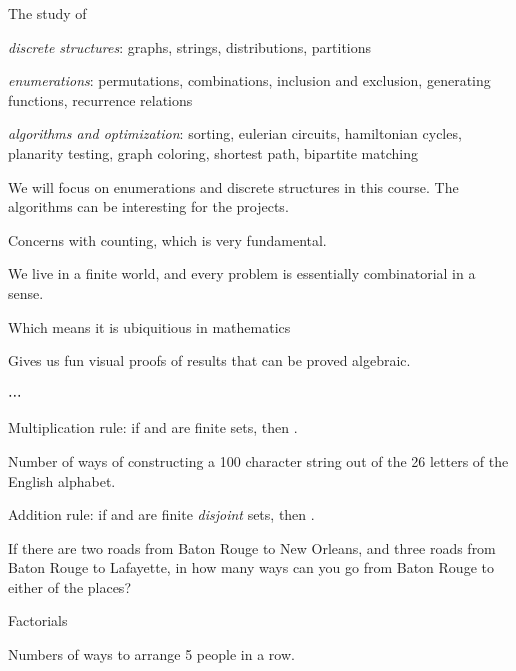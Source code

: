 \startchapter [title={Combinatorics basics}]
	
	\startsection [title={What is combinatorics?}]
		The study of
		\startitemize [r, joinedup]
			\item  \emph{discrete structures}: graphs, strings, distributions, partitions
			\item  \emph{enumerations}: permutations, combinations, inclusion and exclusion, generating functions, recurrence relations
			\item  \emph{algorithms and optimization}: sorting, eulerian circuits, hamiltonian cycles, planarity testing, graph coloring, shortest path, bipartite matching
		\stopitemize

		We will focus on enumerations and discrete structures in this course. The algorithms can be interesting for the projects.

		\startsubject [title={Why is it interesting?}]
			\startitemize [1, joinedup]
				\item  Concerns with counting, which is very fundamental.
				\item  We live in a finite world, and every problem is essentially combinatorial in a sense.
				\item  Which means it is ubiquitious in mathematics
				\item  Gives us fun visual proofs of results that can be proved algebraic.
				\item  ⋯
			\stopitemize
		\stopsubject
	\stopsection

	\startsection [title={Enumerations}]
		
		\startitemize [1, joinedup]
		
			\item  Multiplication rule: if  and  are finite sets, then .

				Number of ways of constructing a 100 character string out of the 26 letters of the English alphabet.

			\item  Addition rule: if  and  are finite \emph{disjoint} sets, then .

				If there are two roads from Baton Rouge to New Orleans, and three roads from Baton Rouge to Lafayette, in how many ways can you go from Baton Rouge to either of the places?

			\item  Factorials

				Numbers of ways to arrange 5 people in a row.
			
